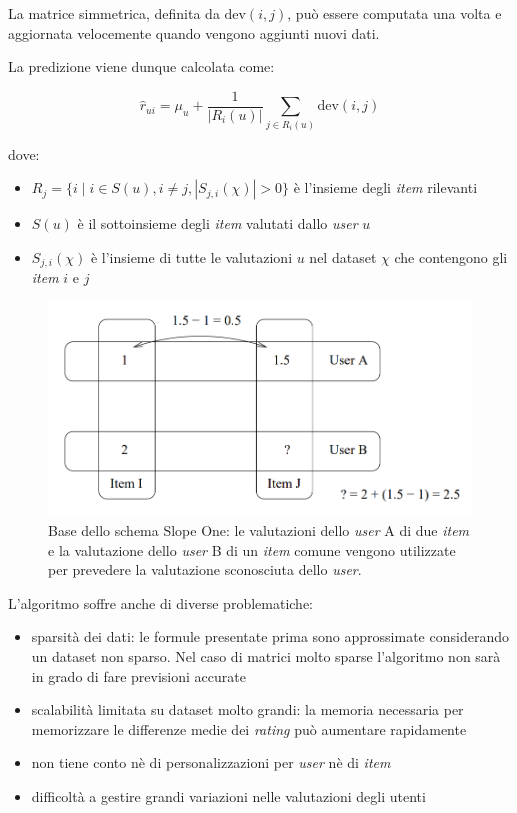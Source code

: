 La matrice simmetrica, definita da $\text{dev}(i, j)$, può essere computata una volta e aggiornata velocemente quando vengono aggiunti nuovi dati.

La predizione viene dunque calcolata come:

\[
    \hat{r}_{ui} = \mu_u + \frac{1}{|R_i(u)|} \sum\limits_{j \in R_i(u)} \text{dev}(i, j)
\]

dove:

\begin{itemize}
    \item $R_j = \{ i \mid i \in S(u), i \neq j, |S_{j,i}(\chi)| > 0 \}$ è l'insieme degli \textit{item} rilevanti
    \item $S(u)$ è il sottoinsieme degli \textit{item} valutati dallo \textit{user} $u$
    \item $S_{j,i}(\chi)$ è l'insieme di tutte le valutazioni $u$ nel dataset $\chi$ che contengono gli \textit{item} $i$ e $j$
\end{itemize}

\begin{figure}[H]
    \centering
    \includegraphics[keepaspectratio]{figures/algorithms/slope_one.PNG}
    \caption{Base dello schema Slope One: le valutazioni dello \textit{user} A di due \textit{item} e la valutazione  dello \textit{user} B di un \textit{item} comune vengono utilizzate per prevedere la valutazione sconosciuta dello \textit{user}.}
    \label{fig:slopeone}
\end{figure}

L'algoritmo soffre anche di diverse problematiche:
\begin{itemize}
    \item sparsità dei dati: le formule presentate prima sono approssimate considerando un dataset non sparso. Nel caso di matrici molto sparse l'algoritmo non sarà in grado di fare previsioni accurate
    \item scalabilità limitata su dataset molto grandi: la memoria necessaria per memorizzare le differenze medie dei \textit{rating} può aumentare rapidamente
    \item non tiene conto nè di personalizzazioni per \textit{user} nè di \textit{item}
    \item difficoltà a gestire grandi variazioni nelle valutazioni degli utenti
\end{itemize}


